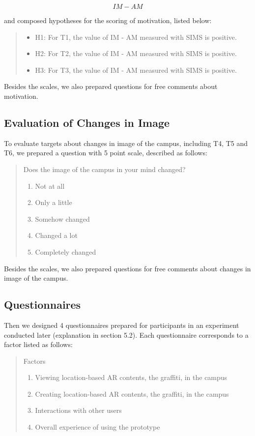 \[ IM - AM \]

and composed hypotheses for the scoring of motivation, listed below: 

\begin{quote}
  \begin{itemize}
    \item H1: For T1, the value of IM - AM measured with SIMS is positive.
    \item H2: For T2, the value of IM - AM measured with SIMS is positive.
    \item H3: For T3, the value of IM - AM measured with SIMS is positive.
  \end{itemize}
\end{quote}

Besides the scales, we also prepared questions for free comments about motivation.

\subsection{Evaluation of Changes in Image}

To evaluate targets about changes in image of the campus, including T4, T5 and T6,
we prepared a question with 5 point scale, described as follows:

\begin{quote}
  Does the image of the campus in your mind changed?
  \begin{enumerate}
    \item Not at all
    \item Only a little
    \item Somehow changed
    \item Changed a lot
    \item Completely changed
  \end{enumerate}
\end{quote}

Besides the scales, we also prepared questions for free comments about changes in image of the campus.

\subsection{Questionnaires}

Then we designed 4 questionnaires prepared for participants in an experiment conducted later (explanation in section 5.2). Each questionnaire corresponds to a factor listed as follows:

\begin{quote}
  Factors
  \begin{enumerate}
    \item Viewing location-based AR contents, the graffiti, in the campus
    \item Creating location-based AR contents, the graffiti, in the campus
    \item Interactions with other users
    \item Overall experience of using the prototype
  \end{enumerate}
\end{quote}

